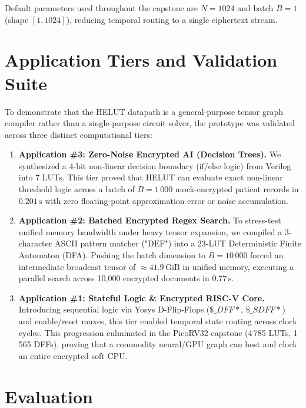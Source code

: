 \documentclass[11pt,a4paper]{article}
\begin{document}
Default parameters used throughout the capstone are $N=1024$ and batch $B=1$
(shape $[1,1024]$), reducing temporal routing to a single ciphertext stream.

\section{Application Tiers and Validation Suite}
\label{sec:applications}

To demonstrate that the HELUT datapath is a general-purpose tensor graph compiler rather than a single-purpose circuit solver, the prototype was validated across three distinct computational tiers:

\begin{enumerate}[leftmargin=*,itemsep=3pt]
  \item \textbf{Application \#3: Zero-Noise Encrypted AI (Decision Trees).} 
        We synthesized a 4-bit non-linear decision boundary ($\mathrm{if/else}$ logic) from Verilog into $7$ LUTs. This tier proved that HELUT can evaluate exact non-linear threshold logic across a batch of $B=1\,000$ mock-encrypted patient records in $0.201\,\mathrm{s}$ with zero floating-point approximation error or noise accumulation.
  
  \item \textbf{Application \#2: Batched Encrypted Regex Search.} 
        To stress-test unified memory bandwidth under heavy tensor expansion, we compiled a 3-character ASCII pattern matcher ($\text{"DEF"}$) into a 23-LUT Deterministic Finite Automaton (DFA). Pushing the batch dimension to $B=10\,000$ forced an intermediate broadcast tensor of $\approx 41.9\,\mathrm{GiB}$ in unified memory, executing a parallel search across 10,000 encrypted documents in $0.77\,\mathrm{s}$.
  
  \item \textbf{Application \#1: Stateful Logic \& Encrypted RISC-V Core.} 
        Introducing sequential logic via Yosys D-Flip-Flops ($\mathit{\$\_DFF*}$, $\mathit{\$\_SDFF*}$) and enable/reset muxes, this tier enabled temporal state routing across clock cycles. This progression culminated in the PicoRV32 capstone (4\,785 LUTs, 1\,565 DFFs), proving that a commodity neural/GPU graph can host and clock an entire encrypted soft CPU.
\end{enumerate}

\section{Evaluation}
\label{sec:eval}
\end{document}
